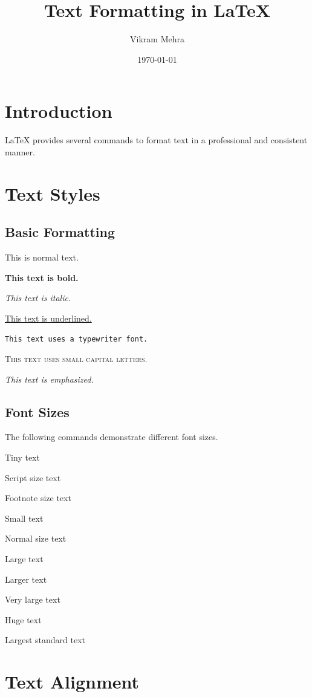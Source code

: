 \documentclass[12pt,a4paper]{article}
\title{Text Formatting in LaTeX}
\author{Vikram Mehra}
\date{\today}
\begin{document}
\maketitle

\section{Introduction}

LaTeX provides several commands to format text in a
professional and consistent manner.

\section{Text Styles}

\subsection{Basic Formatting}

This is normal text.

\textbf{This text is bold.}

\textit{This text is italic.}

\underline{This text is underlined.}

\texttt{This text uses a typewriter font.}

\textsc{This text uses small capital letters.}

\emph{This text is emphasized.}

\subsection{Font Sizes}

The following commands demonstrate different font sizes.

{\tiny Tiny text}

{\scriptsize Script size text}

{\footnotesize Footnote size text}

{\small Small text}

{\normalsize Normal size text}

{\large Large text}

{\Large Larger text}

{\LARGE Very large text}

{\huge Huge text}

{\Huge Largest standard text}

\section{Text Alignment}
\end{document}
